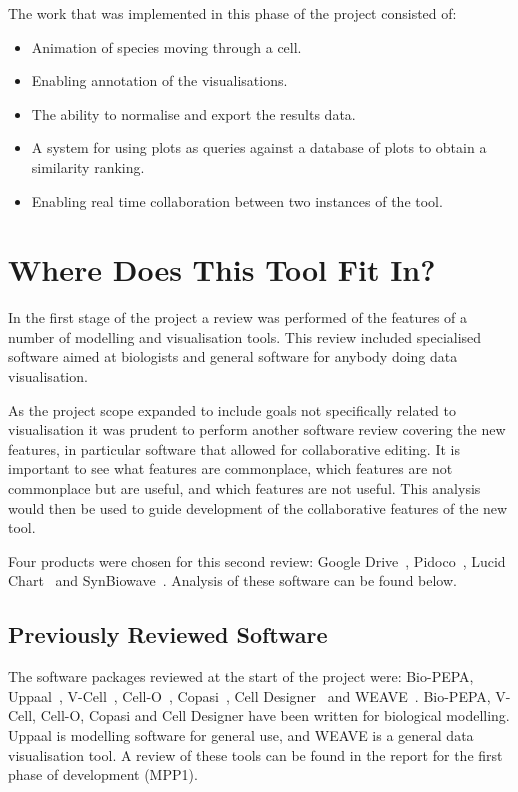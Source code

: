 The work that was implemented in this phase of the project consisted of:
\begin{itemize}
\item Animation of species moving through a cell.
\item Enabling annotation of the visualisations.
\item The ability to normalise and export the results data.
\item A system for using plots as queries against a database of plots to obtain a similarity ranking.
\item Enabling real time collaboration between two instances of the tool.
\end{itemize}

\section{Where Does This Tool Fit In?}
\label{sec:review}

In the first stage of the project a review was performed of the features of a number of modelling and visualisation tools.  This review included specialised software aimed at biologists and general software for anybody doing data visualisation.

As the project scope expanded to include goals not specifically related to visualisation it was prudent to perform another software review covering the new features, in particular software that allowed for collaborative editing.  It is important to see what features are commonplace, which features are not commonplace but are useful, and which features are not useful. This analysis would then be used to guide development of the collaborative features of the new tool.

Four products were chosen for this second review: Google Drive~\cite{g_drive}, Pidoco~\cite{pidoco}, Lucid Chart~\cite{lucid} and SynBiowave~\cite{sbw}.  Analysis of these software can be found below.

\subsection{Previously Reviewed Software}

The software packages reviewed at the start of the project were: Bio-PEPA, Uppaal~\cite{uppaal}, V-Cell~\cite{vcell}, Cell-O~\cite{cello}, Copasi~\cite{copasi}, Cell Designer~\cite{celldesigner} and WEAVE~\cite{weave}.  Bio-PEPA, V-Cell, Cell-O, Copasi and Cell Designer have been written for biological modelling.  Uppaal is modelling software for general use, and WEAVE is a general data visualisation tool.  A review of these tools can be found in the report for the first phase of development (MPP1).

